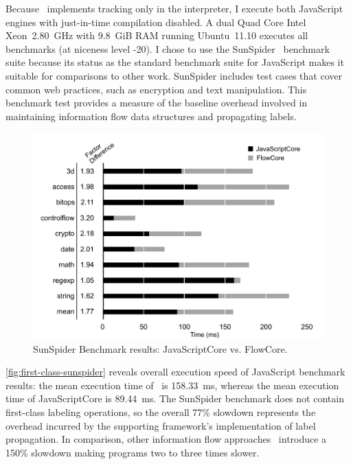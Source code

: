 Because \FlowCore\ implements tracking only in the interpreter, I execute both JavaScript engines with just-in-time compilation disabled.
A dual Quad Core Intel Xeon~2.80~GHz with 9.8~GiB RAM running Ubuntu~11.10 executes all benchmarks (at niceness level -20).
I chose to use the SunSpider~\cite{sunspider} benchmark suite because its status as the standard benchmark suite for JavaScript makes it suitable for comparisons to other work.
SunSpider includes test cases that cover common web practices, such as encryption and text manipulation.
This benchmark test provides a measure of the baseline overhead involved in maintaining information flow data structures and propagating labels.

\begin{figure}[ht]
	\centering
  \includegraphics[width=\textwidth,keepaspectratio=true]{graphics/sunspider-jsc-vs-flowcore.pdf}
  \caption{SunSpider Benchmark results: JavaScriptCore vs. FlowCore.}
  \label{fig:first-class-sunspider}
\end{figure}


\autoref{fig:first-class-sunspider} reveals overall execution speed of JavaScript benchmark results: the mean execution time of \FlowCore\ is 158.33~ms, whereas the mean execution time of JavaScriptCore is 89.44~ms.
The SunSpider benchmark does not contain first-class labeling operations, so the overall 77\% slowdown represents the overhead incurred by the supporting framework's implementation of label propagation.
In comparison, other information flow approaches~\cite{just.etal+11} introduce a 150\% slowdown making programs two to three times slower.

